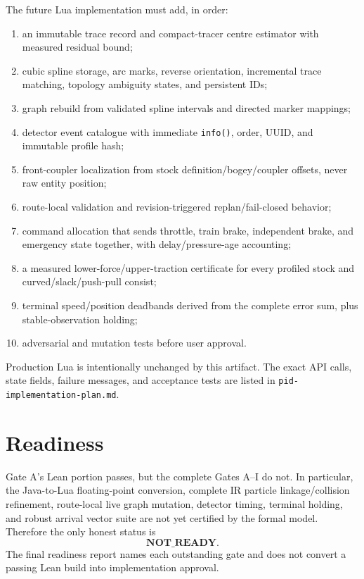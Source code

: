 \documentclass[10pt,a4paper]{article}
\begin{document}
The future Lua implementation must add, in order:
\begin{enumerate}
  \item an immutable trace record and compact-tracer centre estimator with
    measured residual bound;
  \item cubic spline storage, arc marks, reverse orientation, incremental
    trace matching, topology ambiguity states, and persistent IDs;
  \item graph rebuild from validated spline intervals and directed marker
    mappings;
  \item detector event catalogue with immediate \texttt{info()}, order,
    UUID, and immutable profile hash;
  \item front-coupler localization from stock definition/bogey/coupler
    offsets, never raw entity position;
  \item route-local validation and revision-triggered replan/fail-closed
    behavior;
  \item command allocation that sends throttle, train brake, independent
    brake, and emergency state together, with delay/pressure-age accounting;
  \item a measured lower-force/upper-traction certificate for every profiled
    stock and curved/slack/push-pull consist;
  \item terminal speed/position deadbands derived from the complete error sum,
    plus stable-observation holding;
  \item adversarial and mutation tests before user approval.
\end{enumerate}

Production Lua is intentionally unchanged by this artifact.  The exact API
calls, state fields, failure messages, and acceptance tests are listed in
\texttt{pid-implementation-plan.md}.

\section{Readiness}

Gate A's Lean portion passes, but the complete Gates A--I do not.  In
particular, the Java-to-Lua floating-point conversion, complete IR particle
linkage/collision refinement, route-local live graph mutation, detector timing,
terminal holding, and robust arrival vector suite are not yet certified by the
formal model.  Therefore the only honest status is
\[
  \boxed{\textbf{NOT\_READY}}.
\]
The final readiness report names each outstanding gate and does not convert a
passing Lean build into implementation approval.
\end{document}
